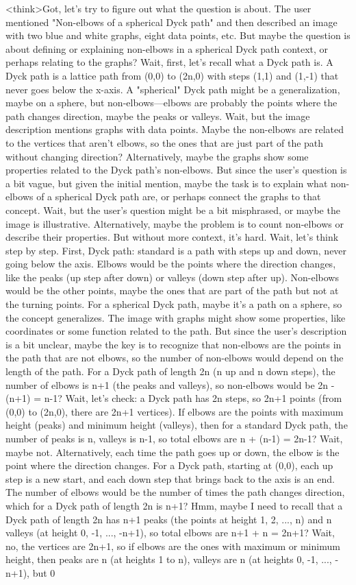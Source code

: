 <think>Got, let's try to figure out what the question is about. The user mentioned "Non-elbows of a spherical Dyck path" and then described an image with two blue and white graphs, eight data points, etc. But maybe the question is about defining or explaining non-elbows in a spherical Dyck path context, or perhaps relating to the graphs? Wait, first, let's recall what a Dyck path is. A Dyck path is a lattice path from (0,0) to (2n,0) with steps (1,1) and (1,-1) that never goes below the x-axis. A "spherical" Dyck path might be a generalization, maybe on a sphere, but non-elbows—elbows are probably the points where the path changes direction, maybe the peaks or valleys. Wait, but the image description mentions graphs with data points. Maybe the non-elbows are related to the vertices that aren't elbows, so the ones that are just part of the path without changing direction? Alternatively, maybe the graphs show some properties related to the Dyck path's non-elbows. But since the user's question is a bit vague, but given the initial mention, maybe the task is to explain what non-elbows of a spherical Dyck path are, or perhaps connect the graphs to that concept. Wait, but the user's question might be a bit misphrased, or maybe the image is illustrative. Alternatively, maybe the problem is to count non-elbows or describe their properties. But without more context, it's hard. Wait, let's think step by step. First, Dyck path: standard is a path with steps up and down, never going below the axis. Elbows would be the points where the direction changes, like the peaks (up step after down) or valleys (down step after up). Non-elbows would be the other points, maybe the ones that are part of the path but not at the turning points. For a spherical Dyck path, maybe it's a path on a sphere, so the concept generalizes. The image with graphs might show some properties, like coordinates or some function related to the path. But since the user's description is a bit unclear, maybe the key is to recognize that non-elbows are the points in the path that are not elbows, so the number of non-elbows would depend on the length of the path. For a Dyck path of length 2n (n up and n down steps), the number of elbows is n+1 (the peaks and valleys), so non-elbows would be 2n - (n+1) = n-1? Wait, let's check: a Dyck path has 2n steps, so 2n+1 points (from (0,0) to (2n,0), there are 2n+1 vertices). If elbows are the points with maximum height (peaks) and minimum height (valleys), then for a standard Dyck path, the number of peaks is n, valleys is n-1, so total elbows are n + (n-1) = 2n-1? Wait, maybe not. Alternatively, each time the path goes up or down, the elbow is the point where the direction changes. For a Dyck path, starting at (0,0), each up step is a new start, and each down step that brings back to the axis is an end. The number of elbows would be the number of times the path changes direction, which for a Dyck path of length 2n is n+1? Hmm, maybe I need to recall that a Dyck path of length 2n has n+1 peaks (the points at height 1, 2, ..., n) and n valleys (at height 0, -1, ..., -n+1), so total elbows are n+1 + n = 2n+1? Wait, no, the vertices are 2n+1, so if elbows are the ones with maximum or minimum height, then peaks are n (at heights 1 to n), valleys are n (at heights 0, -1, ..., -n+1), but 0 